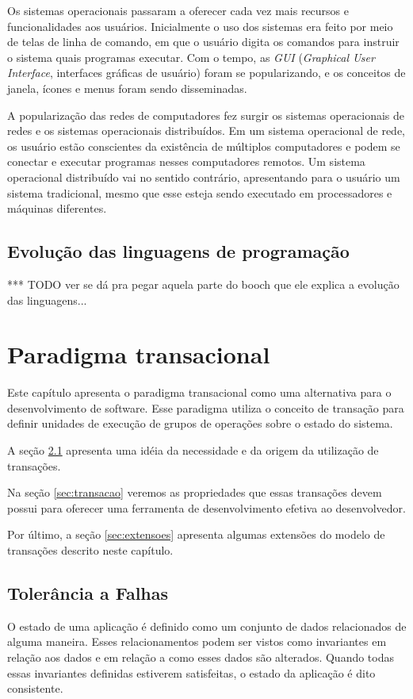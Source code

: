 \documentclass[11pt,twoside,a4paper]{book}
\begin{document}
Os sistemas operacionais passaram a oferecer cada vez mais recursos e funcionalidades aos usuários. Inicialmente o uso dos sistemas era feito por meio de telas de linha de comando, em que o usuário digita os comandos para instruir o sistema quais programas executar. Com o tempo, as \emph{GUI} (\emph{Graphical User Interface}, interfaces gráficas de usuário) foram se popularizando, e os conceitos de janela, ícones e menus foram sendo disseminadas.

A popularização das redes de computadores fez surgir os sistemas operacionais de redes e os sistemas operacionais distribuídos. Em um sistema operacional de rede, os usuário estão conscientes da existência de múltiplos computadores e podem se conectar e executar programas nesses computadores remotos. Um sistema operacional distribuído vai no sentido contrário, apresentando para o usuário um sistema tradicional, mesmo que esse esteja sendo executado em processadores e máquinas diferentes.

\section{Evolução das linguagens de programação}
\label{sec:evolucao_linguagens_programacao}
*** TODO ver se dá pra pegar aquela parte do booch que ele explica a evolução das linguagens...

\chapter{Paradigma transacional}
\label{chap:transacao}
Este capítulo apresenta o paradigma transacional como uma alternativa para o desenvolvimento de software. Esse paradigma utiliza o conceito de transação para definir unidades de execução de grupos de operações sobre o estado do sistema.

A seção \ref{sec:tolerancia_a_falhas} apresenta uma idéia da necessidade e da origem da utilização de transações.

Na seção \ref{sec:transacao} veremos as propriedades que essas transações devem possui para oferecer uma ferramenta de desenvolvimento efetiva ao desenvolvedor.

Por último, a seção \ref{sec:extensoes} apresenta algumas extensões do modelo de transações descrito neste capítulo.

\section{Tolerância a Falhas}
\label{sec:tolerancia_a_falhas}
O estado de uma aplicação é definido como um conjunto de dados relacionados de alguma maneira. Esses relacionamentos podem ser vistos como invariantes em relação aos dados e em relação a como esses dados são alterados. Quando todas essas invariantes definidas estiverem satisfeitas, o estado da aplicação é dito consistente.
\end{document}
